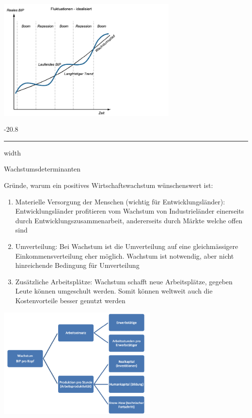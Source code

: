 \documentclass[9pt, landscape, fleqn]{scrartcl}
\makeatletter
\renewcommand{\subsubsection}{\@startsection{subsubsection}{1}{0mm}%
{-2\baselineskip}{0.8\baselineskip}%
{\hrule depth 0.2pt width\columnwidth\vspace*{1.2em}\normalsize\bfseries\rmfamily}}
\makeatother
\begin{document}
\begin{multicols*}{3}
\begin{center}
    \includegraphics[width=9cm]{Konjunkurschwankungen_idealisiert.png}
\end{center}

\subsubsection{Wachstumsdeterminanten}

Gründe, warum ein positives Wirtschaftswachstum wünschenswert ist: 

\begin{enumerate}
    \item Materielle Versorgung der Menschen (wichtig für Entwicklungsländer): Entwicklungsländer profitieren vom Wachstum von Industrieländer einerseits durch Entwicklungszusammenarbeit, andererseits durch Märkte welche offen sind
    \item Umverteilung: Bei Wachstum ist die Umverteilung auf eine gleichmässigere Einkommensverteilung eher möglich. Wachstum ist notwendig, aber nicht hinreichende Bedingung für Umverteilung
    \item Zusätzliche Arbeitsplätze: Wachstum schafft neue Arbeitsplätze, gegeben Leute können umgeschult werden. Somit können weltweit auch die Kostenvorteile besser genutzt werden
\end{enumerate}

\begin{center}
    \includegraphics[width=8cm]{Wachstumsdeterminanten.png}
\end{center}


\end{multicols*}
\end{document}
